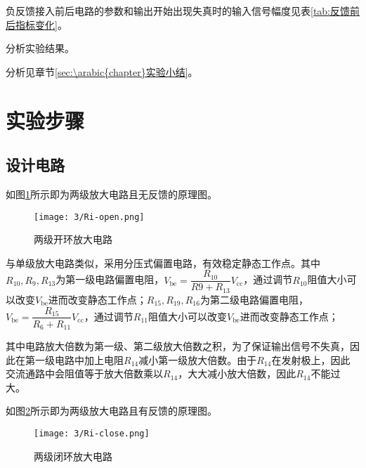 \begin{Answer}
	负反馈接入前后电路的参数和输出开始出现失真时的输入信号幅度见表\ref{tab:反馈前后指标变化}。
\end{Answer}

\begin{Exercise}
	分析实验结果。
\end{Exercise}

\begin{Answer}
	分析见章节\ref{sec:\arabic{chapter}实验小结}。
\end{Answer}

\section{实验步骤}%
\label{sec:\arabic{chapter}实验步骤}

\subsection{设计电路}%
\label{sub:\arabic{chapter}设计电路}

如图\ref{fig:两级开环放大电路}所示即为两级放大电路且无反馈的原理图。

\begin{figure}[H]
	\centering
	\texttt{[image: 3/Ri-open.png]}
	\caption{两级开环放大电路}
	\label{fig:两级开环放大电路}
\end{figure}

与单级放大电路类似，采用分压式偏置电路，有效稳定静态工作点。其中$ R_{10},R_9,R_{13} $为第一级电路偏置电阻，$ V_\mathrm{be} = \dfrac{R_{10}}{R9 + R_{13}}V_\mathrm{cc} $，通过调节$ R_{10} $阻值大小可以改变$ V_\mathrm{be} $进而改变静态工作点；$ R_{15}, R_{19}, R_{16} $为第二级电路偏置电阻，$ V_\mathrm{be} = \dfrac{R_{15}}{R_6 + R_{11}}V_\mathrm{cc} $，通过调节$ R_{11} $阻值大小可以改变$ V_\mathrm{be} $进而改变静态工作点；

其中电路放大倍数为第一级、第二级放大倍数之积，为了保证输出信号不失真，因此在第一级电路中加上电阻$ R_{14} $减小第一级放大倍数。由于$ R_{14} $在发射极上，因此交流通路中会阻值等于放大倍数乘以$ R_{14} $，大大减小放大倍数，因此$ R_{14} $不能过大。

如图\ref{fig:两级闭环放大电路}所示即为两级放大电路且有反馈的原理图。

\begin{figure}[H]
	\centering
	\texttt{[image: 3/Ri-close.png]}
	\caption{两级闭环放大电路}
	\label{fig:两级闭环放大电路}
\end{figure}

